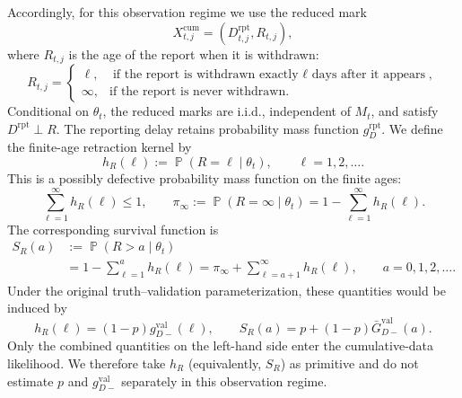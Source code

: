 \documentclass{article}
\theoremstyle{definition}
\theoremstyle{remark}
\newcommand{\Prb}{\operatorname{\mathbb{P}}}
\begin{document}
Accordingly, for this observation regime we use the reduced mark
\begin{equation}\label{reducedcummark}
    X_{t,j}^{\mathrm{cum}}
    =
    \left(D_{t,j}^{\mathrm{rpt}},R_{t,j}\right),
\end{equation}
where $R_{t,j}$ is the age of the report when it is withdrawn:
\begin{equation}
    R_{t,j}
    =
    \begin{cases}
        \ell, & \text{if the report is withdrawn exactly $\ell$ days after it appears},\\
        \infty, & \text{if the report is never withdrawn}.
    \end{cases}
\end{equation}
Conditional on $\theta_t$, the reduced marks are i.i.d., independent of $M_t$,
and satisfy $D^{\mathrm{rpt}}\perp R$. The reporting delay retains probability
mass function $g_D^{\mathrm{rpt}}$. We define the finite-age retraction kernel
by
\begin{equation}\label{hRdef}
    h_R(\ell)
    :=
    \Prb(R=\ell\mid\theta_t),
    \qquad \ell=1,2,\dots.
\end{equation}
This is a possibly defective probability mass function on the finite ages:
\begin{equation}\label{hRmass}
    \sum_{\ell=1}^{\infty}h_R(\ell)\leq 1,
    \qquad
    \pi_\infty
    :=
    \Prb(R=\infty\mid\theta_t)
    =1-\sum_{\ell=1}^{\infty}h_R(\ell).
\end{equation}
The corresponding survival function is
\begin{equation}\label{SRdef}
\begin{split}
    S_R(a)
    &:={}
    \Prb(R>a\mid\theta_t)\\
    &=1-\sum_{\ell=1}^{a}h_R(\ell)
    =\pi_\infty+\sum_{\ell=a+1}^{\infty}h_R(\ell),
    \qquad a=0,1,2,\dots.
\end{split}
\end{equation}
Under the original truth--validation parameterization, these quantities would
be induced by
\begin{equation}\label{collapsedretraction}
    h_R(\ell)
    =(1-p)g_{D-}^{\mathrm{val}}(\ell),
    \qquad
    S_R(a)
    =p+(1-p)\bar G_{D-}^{\mathrm{val}}(a).
\end{equation}
Only the combined quantities on the left-hand side enter the cumulative-data
likelihood. We therefore take $h_R$ (equivalently, $S_R$) as primitive and do
not estimate $p$ and $g_{D-}^{\mathrm{val}}$ separately in this observation
regime.
\end{document}
